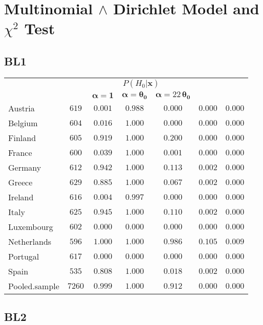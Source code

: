 \documentclass[12pt,a4paper,draft]{article}
\author{Pedro Fonseca}
\begin{document}
\section{Multinomial $\land$ Dirichlet Model and $\chi^2$ Test } 

\subsection{BL1}

\begin{table}[H] 
\begin{center}
\begin{tabular}{|l|c|c|c|c|c|c|}

\hline
\multicolumn{1}{|c|}{{\multirow{2}{*}{Country}}} &  \multicolumn{1}{c|}{{\multirow{2}{*}{$N$}}} & \multicolumn{3}{c|}{$P(H_0| \bm{x})$} &  \multicolumn{1}{c|}{{\multirow{2}{*}{${\underline{P}}{(H_0|\bm{x})}$}}} & \multicolumn{1}{c|}{{\multirow{2}{*}{${p_{\text{{obs}}}}$}}}\tabularnewline
 \cline{3-5}  
  &  & \multicolumn{1}{c|}{$\bm{\alpha} =\bm{1}$}  &  \multicolumn{1}{c|}{$\bm{\alpha} =\bm{\theta_0}$}  &  \multicolumn{1}{c|}{$\bm{\alpha}=22 \, \bm{\theta_0}$}  &  & \\
\hline

Austria&$ 619$&$0.001$&$0.988$&$0.000$&$0.000$&$0.000$\tabularnewline
Belgium&$ 604$&$0.016$&$1.000$&$0.000$&$0.000$&$0.000$\tabularnewline
Finland&$ 605$&$0.919$&$1.000$&$0.200$&$0.000$&$0.000$\tabularnewline
France&$ 600$&$0.039$&$1.000$&$0.001$&$0.000$&$0.000$\tabularnewline
Germany&$ 612$&$0.942$&$1.000$&$0.113$&$0.002$&$0.000$\tabularnewline
Greece&$ 629$&$0.885$&$1.000$&$0.067$&$0.002$&$0.000$\tabularnewline
Ireland&$ 616$&$0.004$&$0.997$&$0.000$&$0.000$&$0.000$\tabularnewline
Italy&$ 625$&$0.945$&$1.000$&$0.110$&$0.002$&$0.000$\tabularnewline
Luxembourg&$ 602$&$0.000$&$0.000$&$0.000$&$0.000$&$0.000$\tabularnewline
Netherlands&$ 596$&$1.000$&$1.000$&$0.986$&$0.105$&$0.009$\tabularnewline
Portugal&$ 617$&$0.000$&$0.000$&$0.000$&$0.000$&$0.000$\tabularnewline
Spain&$ 535$&$0.808$&$1.000$&$0.018$&$0.002$&$0.000$\tabularnewline
Pooled.sample&$7260$&$0.999$&$1.000$&$0.912$&$0.000$&$0.000$\tabularnewline
\hline
\end{tabular}\end{center}
\end{table}

\subsection{BL2}
\end{document}
